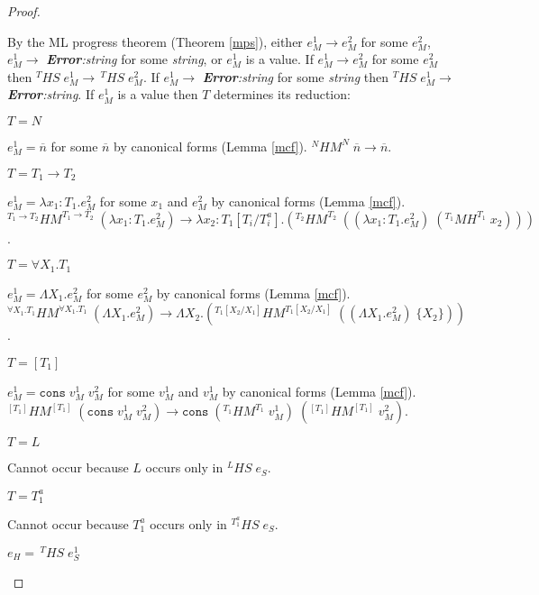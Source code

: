 \begin{theorem}
\begin{proof}
\begin{case}
By the ML progress theorem (Theorem \ref{mps}), either $e_{M}^{1}\rightarrow e_{M}^{2}$ for some $e_{M}^{2}$, $e_{M}^{1}\rightarrow$ \emph{\textbf{Error}:\;string} for some \emph{string}, or $e_{M}^{1}$ is a value.  If $e_{M}^{1}\rightarrow e_{M}^{2}$ for some $e_{M}^{2}$ then $^{T}HS\;e_{M}^{1}\rightarrow\,^{T}HS\;e_{M}^{2}$.  If $e_{M}^{1}\rightarrow$ \emph{\textbf{Error}:\;string} for some \emph{string} then $^{T}HS\;e_{M}^{1}\rightarrow$ \emph{\textbf{Error}:\;string}.  If $e_{M}^{1}$ is a value then $T$ determines its reduction:
\begin{case}
$T=N$

$e_{M}^{1}=\overline{n}$ for some $\overline{n}$ by canonical forms (Lemma \ref{mcf}).  $^{N}HM^{N}\;\overline{n}\rightarrow\overline{n}$.
\end{case}
\begin{case}
$T=T_{1}\rightarrow T_{2}$

$e_{M}^{1}=\lambda x_{1}:T_{1}.e_{M}^{2}$ for some $x_{1}$ and $e_{M}^{2}$ by canonical forms (Lemma \ref{mcf}).  $^{T_{1}\rightarrow T_{2}}HM^{T_{1}\rightarrow T_{2}}\;(\lambda x_{1}:T_{1}.e_{M}^{2})\rightarrow\lambda x_{2}:T_{1}[T_{i}/T^{a}_{i}].(^{T_{2}}HM^{T_{2}}\;((\lambda x_{1}:T_{1}.e_{M}^{2})\;(^{T_{1}}MH^{T_{1}}\;x_{2})))$.
\end{case}
\begin{case}
$T=\forall X_{1}.T_{1}$

$e_{M}^{1}=\Lambda X_{1}.e_{M}^{2}$ for some $e_{M}^{2}$ by canonical forms (Lemma \ref{mcf}).  $^{\forall X_{1}.T_{1}}HM^{\forall X_{1}.T_{1}}\;(\Lambda X_{1}.e_{M}^{2})\rightarrow\Lambda X_{2}.(^{T_{1}[X_{2}/X_{1}]}HM^{T_{1}[X_{2}/X_{1}]}\;((\Lambda X_{1}.e_{M}^{2})\;\lbrace X_{2}\rbrace))$.
\end{case}
\begin{case}
$T=[T_{1}]$

$e_{M}^{1}=\mathtt{cons}\;v_{M}^{1}\;v_{M}^{2}$ for some $v_{M}^{1}$ and $v_{M}^{1}$ by canonical forms (Lemma \ref{mcf}).  $^{[T_{1}]}HM^{[T_{1}]}\;(\mathtt{cons}\;v_{M}^{1}\;v_{M}^{2})\rightarrow\mathtt{cons}\;(^{T_{1}}HM^{T_{1}}\;v_{M}^{1})\;(^{[T_{1}]}HM^{[T_{1}]}\;v_{M}^{2})$.
\end{case}
\begin{case}
$T=L$

Cannot occur because $L$ occurs only in $^{L}HS\;e_{S}$.
\end{case}
\begin{case}
$T=T_{1}^{a}$

Cannot occur because $T_{1}^{a}$ occurs only in $^{T_{1}^{a}}HS\;e_{S}$.
\end{case}
\end{case}
\begin{case}
$e_{H}=\,^{T}HS\;e_{S}^{1}$


\end{case}
\end{proof}
\end{theorem}

